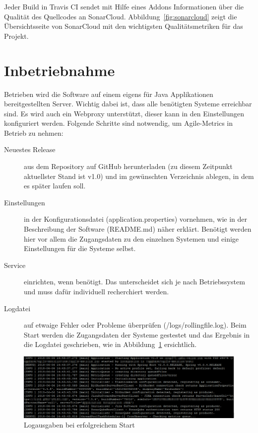 Jeder Build in Travis CI sendet mit Hilfe eines Addons Informationen über die Qualität des Quellcodes an SonarCloud.
Abbildung~\ref{fig:sonarcloud} zeigt die Übersichtsseite von SonarCloud mit den wichtigsten Qualitätsmetriken für das Projekt.

\newpage
\section{Inbetriebnahme}

Betrieben wird die Software auf einem eigens für Java Applikationen bereitgestellten Server. 
Wichtig dabei ist, dass alle benötigten Systeme erreichbar sind. 
Es wird auch ein Webproxy unterstützt, dieser kann in den Einstellungen konfiguriert werden.
Folgende Schritte sind notwendig, um Agile-Metrics in Betrieb zu nehmen:
\begin{description}
    \item[Neuestes Release] aus dem Repository auf GitHub herunterladen (zu diesem Zeitpunkt aktuellster Stand ist v1.0) und im gewünschten Verzeichnis ablegen, in dem es später laufen soll.
    \item[Einstellungen] in der Konfigurationsdatei (application.properties) vornehmen, wie in der Beschreibung der Software (README.md) näher erklärt. Benötigt werden hier vor allem die Zugangsdaten zu den einzelnen Systemen und einige Einstellungen für die Systeme selbst.
    \item[Service] einrichten, wenn benötigt. Das unterscheidet sich je nach Betriebssystem und muss dafür individuell recherchiert werden.
    \item[Logdatei] auf etwaige Fehler oder Probleme überprüfen (/logs/rollingfile.log). Beim Start werden die Zugangsdaten der Systeme gestestet und das Ergebnis in die Logdatei geschrieben, wie in Abbildung~\ref{fig:successful-start} ersichtlich.
\end{description}

\begin{savenotes}
    \begin{figure}[H] 
        \centering
            \includegraphics[width=1.0\textwidth]{img/successful-start.png}
        \caption{Logausgaben bei erfolgreichem Start}\label{fig:successful-start}
    \end{figure}
\end{savenotes}

